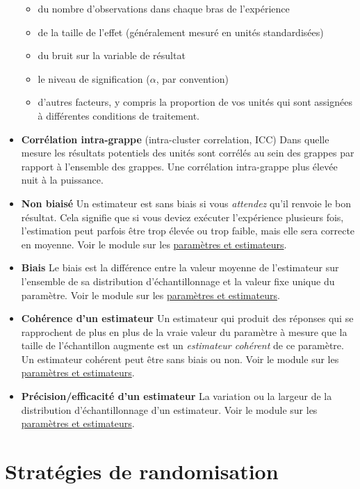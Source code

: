 \documentclass[12pt,]{book}
\providecommand{\tightlist}{%
  \setlength{\itemsep}{0pt}\setlength{\parskip}{0pt}}
\begin{document}
\begin{itemize}
  \begin{itemize}
  \tightlist
  \item
    du nombre d'observations dans chaque bras de l'expérience
  \item
    de la taille de l'effet (généralement mesuré en unités standardisées)
  \item
    du bruit sur la variable de résultat
  \item
    le niveau de signification (\(\alpha\), par convention)
  \item
    d'autres facteurs, y compris la proportion de vos unités qui sont assignées à différentes conditions de traitement.
  \end{itemize}
\item
  \textbf{Corrélation intra-grappe} (intra-cluster correlation, ICC) Dans quelle mesure les résultats potentiels des unités sont corrélés au sein des grappes par rapport à l'ensemble des grappes. Une corrélation intra-grappe plus élevée nuit à la puissance.
\item
  \textbf{Non biaisé} Un estimateur est sans biais si vous \emph{attendez} qu'il renvoie le bon résultat. Cela signifie que si vous deviez exécuter l'expérience plusieurs fois,
  l'estimation peut parfois être trop élevée ou trop faible, mais elle sera correcte en moyenne. Voir le module sur les \href{paramètres-et-estimateurs.html}{paramètres et estimateurs}.
\item
  \textbf{Biais} Le biais est la différence entre la valeur moyenne de l'estimateur sur l'ensemble de sa distribution d'échantillonnage et la valeur fixe unique du paramètre.
  Voir le module sur les \href{paramètres-et-estimateurs.html}{paramètres et estimateurs}.
\item
  \textbf{Cohérence d'un estimateur} Un estimateur qui produit des réponses qui se rapprochent de plus en plus de la vraie valeur du paramètre à mesure que la taille de l'échantillon augmente est un \emph{estimateur cohérent} de ce paramètre. Un estimateur cohérent peut être sans biais ou non.
  Voir le module sur les \href{paramètres-et-estimateurs.html}{paramètres et estimateurs}.
\item
  \textbf{Précision/efficacité d'un estimateur} La variation ou la largeur de la distribution d'échantillonnage d'un estimateur. Voir le module sur les \href{paramètres-et-estimateurs.html}{paramètres et estimateurs}.
\end{itemize}

\hypertarget{stratuxe9gies-de-randomisation}{%
\section{Stratégies de randomisation}\label{stratuxe9gies-de-randomisation}}
\end{document}
